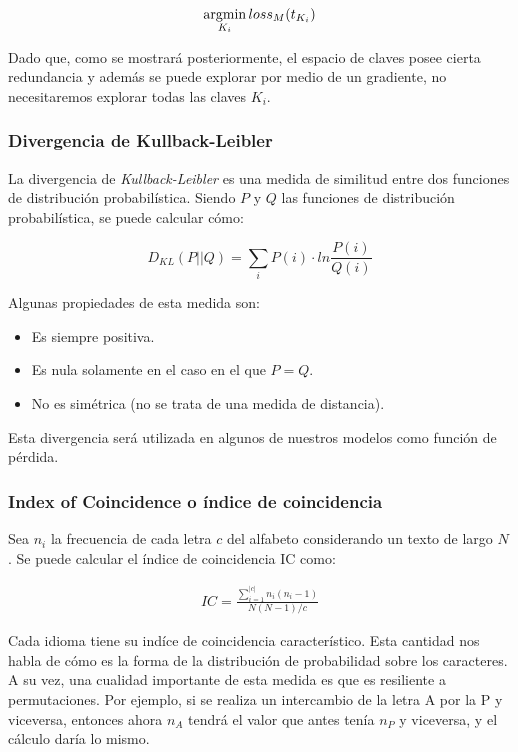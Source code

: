 \documentclass[a4paper,10pt]{article}
\newcommand{\argmin}{\operatornamewithlimits{argmin}}
\begin{document}
\begin{align}
    \argmin_{K_i} {loss}_M(t_{K_i})
\end{align}

Dado que, como se mostrará posteriormente, el espacio de claves posee cierta redundancia y además se puede explorar por medio de un gradiente, no necesitaremos explorar todas las claves $K_i$.

\subsubsection{Divergencia de Kullback-Leibler}

La divergencia de \textit{Kullback-Leibler} es una medida de similitud entre dos funciones de distribución probabilística. Siendo $P$ y $Q$ las funciones de distribución probabilística, se puede calcular cómo:

\begin{equation}
    D_{KL}(P||Q) =  \sum_{i} P(i) \cdot ln \frac{P(i)}{Q(i)} 
\end{equation}

Algunas propiedades de esta medida son:

\begin{itemize}
    \item Es siempre positiva.
    \item Es nula solamente en el caso en el que $P = Q$.
    \item No es simétrica (no se trata de una medida de distancia).
\end{itemize}

Esta divergencia será utilizada en algunos de nuestros modelos como función de pérdida.

\subsubsection{Index of Coincidence o índice de coincidencia\cite{ic}}

Sea $n_i$ la frecuencia de cada letra $c$ del alfabeto considerando un texto de largo $N$. Se puede calcular el índice de coincidencia IC como:

\begin{align}
    {IC} = \frac{\sum_{i=1}^{|c|} n_i(n_i-1)}{N(N-1)/c}
\end{align}

Cada idioma tiene su indíce de coincidencia característico. Esta cantidad nos habla de cómo es la forma de la distribución de probabilidad sobre los caracteres. A su vez, una cualidad importante de esta medida es que es resiliente a permutaciones. Por ejemplo, si se realiza un intercambio de la letra A por la P y viceversa, entonces ahora $n_A$ tendrá el valor que antes tenía $n_P$ y viceversa, y el cálculo daría lo mismo.
\end{document}
